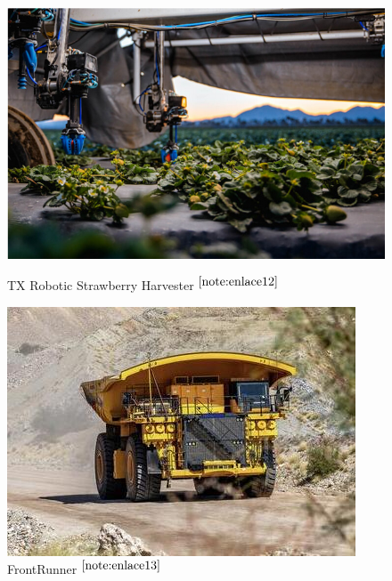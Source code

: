  
\begin{figure}[ht!]
	\centering
	\begin{minipage}{0.3\linewidth}
		\centering
		\includegraphics[width=\linewidth]{figs/strawberry.png}
		\caption*{\centering TX Robotic Strawberry Harvester $^{\ref{note:enlace12}}$}
	\end{minipage}
	\hspace{0.5cm}
	\begin{minipage}{0.3\linewidth}
		\centering
		\includegraphics[width=\linewidth]{figs/komatsu.jpeg}
		\caption*{\centering FrontRunner $^{\ref{note:enlace13}}$ }
	\end{minipage}
	\hspace{0.5cm}

\end{figure}
